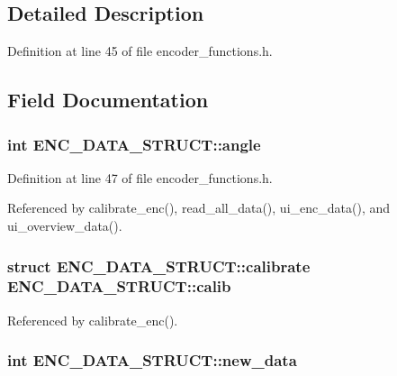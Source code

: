 \subsection{Detailed Description}


Definition at line 45 of file encoder\-\_\-functions.\-h.



\subsection{Field Documentation}
\hypertarget{structENC__DATA__STRUCT_ad25beb30fd5b975292f87db02ec9930a}{
\subsubsection[{angle}]{\setlength{\rightskip}{0pt plus 5cm}int E\-N\-C\-\_\-\-D\-A\-T\-A\-\_\-\-S\-T\-R\-U\-C\-T\-::angle}}\label{structENC__DATA__STRUCT_ad25beb30fd5b975292f87db02ec9930a}


Definition at line 47 of file encoder\-\_\-functions.\-h.



Referenced by calibrate\-\_\-enc(), read\-\_\-all\-\_\-data(), ui\-\_\-enc\-\_\-data(), and ui\-\_\-overview\-\_\-data().

\hypertarget{structENC__DATA__STRUCT_af227e5bbb714b830cc570432bda0a468}{
\subsubsection[{calib}]{\setlength{\rightskip}{0pt plus 5cm}struct {\bf E\-N\-C\-\_\-\-D\-A\-T\-A\-\_\-\-S\-T\-R\-U\-C\-T\-::calibrate} E\-N\-C\-\_\-\-D\-A\-T\-A\-\_\-\-S\-T\-R\-U\-C\-T\-::calib}}\label{structENC__DATA__STRUCT_af227e5bbb714b830cc570432bda0a468}


Referenced by calibrate\-\_\-enc().

\hypertarget{structENC__DATA__STRUCT_adbfb6e5764f0e3c42f4e212deb5d1f21}{
\subsubsection[{new\-\_\-data}]{\setlength{\rightskip}{0pt plus 5cm}int E\-N\-C\-\_\-\-D\-A\-T\-A\-\_\-\-S\-T\-R\-U\-C\-T\-::new\-\_\-data}}\label{structENC__DATA__STRUCT_adbfb6e5764f0e3c42f4e212deb5d1f21}


